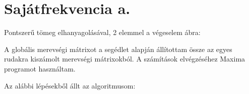\documentclass[12pt,a4paper] {article}
\begin{document}


\section{Sajátfrekvencia a.}
{\large Pontszerű tömeg elhanyagolásával, 2 elemmel a végeselem ábra:}\par
\vspace{15mm}
\par
\vspace{15mm}
\noindent
A globális merevségi mátrixot a segédlet alapján állítottam össze az egyes rudakra kiszámolt merevségi mátrixokból. A számítások elvégzéséhez Maxima programot használtam.\par
\vspace{5mm}
\noindent
Az alábbi lépésekből állt az algoritmusom: \par
\end{document}
